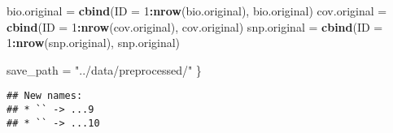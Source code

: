 \documentclass[]{article}
\newenvironment{Shaded}{\begin{snugshade}}{\end{snugshade}}
\newcommand{\DataTypeTok}[1]{\textcolor[rgb]{0.13,0.29,0.53}{#1}}
\newcommand{\DecValTok}[1]{\textcolor[rgb]{0.00,0.00,0.81}{#1}}
\newcommand{\KeywordTok}[1]{\textcolor[rgb]{0.13,0.29,0.53}{\textbf{#1}}}
\newcommand{\NormalTok}[1]{#1}
\newcommand{\OperatorTok}[1]{\textcolor[rgb]{0.81,0.36,0.00}{\textbf{#1}}}
\newcommand{\StringTok}[1]{\textcolor[rgb]{0.31,0.60,0.02}{#1}}
\begin{document}
\begin{Shaded}
\begin{Highlighting}[]
\NormalTok{    bio.original =}\StringTok{ }\KeywordTok{cbind}\NormalTok{(}\DataTypeTok{ID =} \DecValTok{1}\OperatorTok{:}\KeywordTok{nrow}\NormalTok{(bio.original), bio.original)}
\NormalTok{    cov.original =}\StringTok{ }\KeywordTok{cbind}\NormalTok{(}\DataTypeTok{ID =} \DecValTok{1}\OperatorTok{:}\KeywordTok{nrow}\NormalTok{(cov.original), cov.original)}
\NormalTok{    snp.original =}\StringTok{ }\KeywordTok{cbind}\NormalTok{(}\DataTypeTok{ID =} \DecValTok{1}\OperatorTok{:}\KeywordTok{nrow}\NormalTok{(snp.original), snp.original)}
    
\NormalTok{    save_path =}\StringTok{ "../data/preprocessed/"}
\NormalTok{\}}
\end{Highlighting}
\end{Shaded}

\begin{verbatim}
## New names:
## * `` -> ...9
## * `` -> ...10
\end{verbatim}
\end{document}
